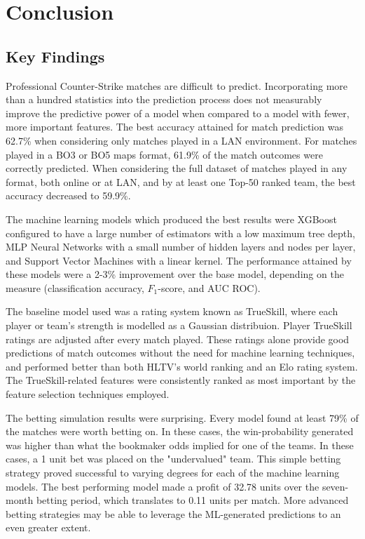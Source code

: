 \chapter{Conclusion}
\label{Conclusion}

\section{Key Findings}

Professional Counter-Strike matches are difficult to predict. Incorporating more than a hundred statistics into the prediction process does not measurably improve the predictive power of a model when compared to a model with fewer, more important features. The best accuracy attained for match prediction was 62.7\% when considering only matches played in a LAN environment. For matches played in a BO3 or BO5 maps format, 61.9\% of the match outcomes were correctly predicted. When considering the full dataset of matches played in any format, both online or at LAN, and by at least one Top-50 ranked team, the best accuracy decreased to 59.9\%.

The machine learning models which produced the best results were XGBoost configured to have a large number of estimators with a low maximum tree depth, MLP Neural Networks with a small number of hidden layers and nodes per layer, and Support Vector Machines with a linear kernel. The performance attained by these models were a 2-3\% improvement over the base model, depending on the measure (classification accuracy, $F_1$-score, and AUC ROC).

The baseline model used was a rating system known as TrueSkill, where each player or team's strength is modelled as a Gaussian distribuion. Player TrueSkill ratings are adjusted after every match played. These ratings alone provide good predictions of match outcomes without the need for machine learning techniques, and performed better than both HLTV's world ranking and an Elo rating system. The TrueSkill-related features were consistently ranked as most important by the feature selection techniques employed.

The betting simulation results were surprising. Every model found at least 79\% of the matches were worth betting on. In these cases, the win-probability generated was higher than what the bookmaker odds implied for one of the teams. In these cases, a 1 unit bet was placed on the "undervalued" team. This simple betting strategy proved successful to varying degrees for each of the machine learning models. The best performing model made a profit of 32.78 units over the seven-month betting period, which translates to 0.11 units per match. More advanced betting strategies may be able to leverage the ML-generated predictions to an even greater extent.


